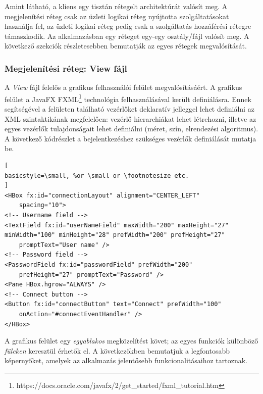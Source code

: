 \documentclass[11pt, a4paper]{article}
\begin{document}
	Amint látható, a kliens egy tisztán rétegelt architektúrát valósít meg. A megjelenítési réteg csak az üzleti logikai réteg  nyújtotta szolgáltatásokat használja fel, az üzleti logikai réteg pedig csak a szolgáltatás hozzáférési rétegre támaszkodik. Az alkalmazásban egy réteget egy-egy osztály/fájl valósít meg. A következő szekciók részletesebben bemutatják az egyes rétegek megvalósítását.
     
     \subsubsection{Megjelenítési réteg: View fájl}
     A \textsl{View} fájl felelős a grafikus felhasználói felület megvalósításáért. A grafikus felület a JavaFX FXML\footnote{https://docs.oracle.com/javafx/2/get\_started/fxml\_tutorial.htm} technológia felhasználásával került definiálásra. Ennek segítségével a felületen található vezérlőket deklaratív jelleggel lehet definiálni az XML szintaktikának megfelelően: vezérlő hierarchiákat lehet létrehozni, illetve az egyes vezérlők tulajdonságait lehet definiálni (méret, szín, elrendezési algoritmus). A következő kódrészlet a bejelentkezéshez szükséges vezérlők definiálását mutatja be.
     
\begin{lstlisting}[
basicstyle=\small, %or \small or \footnotesize etc.
]
<HBox fx:id="connectionLayout" alignment="CENTER_LEFT"
	spacing="10">
<!-- Username field -->
<TextField fx:id="userNameField" maxWidth="200" maxHeight="27"
minWidth="100" minHeight="28" prefWidth="200" prefHeight="27" 
	promptText="User name" />	
<!-- Password field -->
<PasswordField fx:id="passwordField" prefWidth="200" 
	prefHeight="27" promptText="Password" />	
<Pane HBox.hgrow="ALWAYS" />
<!-- Connect button -->			
<Button fx:id="connectButton" text="Connect" prefWidth="100" 
	onAction="#connectEventHandler" />
</HBox>
\end{lstlisting}
     
     A grafikus felület egy \emph{egyablakos} megközelítést követ; az egyes funkciók különböző \emph{füleken} keresztül érhetők el. A következőkben bemutatjuk a legfontosabb képernyőket, amelyek az alkalmazás jelentősebb funkcionalitásaihoz tartoznak.
     
\end{document}

